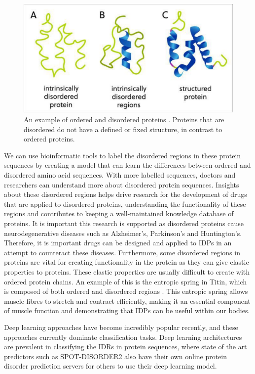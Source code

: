 \documentclass{l4proj}
\begin{document}
\begin{figure}[!htb]
    \centering
    \includegraphics[width=\linewidth]{images/structprot.pdf}

    \caption{An example of ordered and disordered proteins \citep{Tenchov:22}. Proteins that are disordered do not have a defined or fixed structure, in contrast to ordered proteins.}
    \label{fig:structured prot} 
\end{figure}

We can use bioinformatic tools to label the disordered regions in these protein sequences by creating a model that can learn the differences between ordered and disordered amino acid sequences. With more labelled sequences, doctors and researchers can understand more about disordered protein sequences. Insights about these disordered regions helps drive research for the development of drugs that are applied to disordered proteins, understanding the functionality of these regions and contributes to keeping a well-maintained knowledge database of proteins. It is important this research is supported as disordered proteins cause neurodegenerative diseases such as Alzheimer’s, Parkinson’s and Huntington’s. Therefore, it is important drugs can be designed and applied to IDPs in an attempt to counteract these diseases. Furthermore, some disordered regions in proteins are vital for creating functionality in the protein as they can give elastic properties to proteins. These elastic properties are usually difficult to create with ordered protein chains. An example of this is the entropic spring in Titin, which is composed of both ordered and disordered regions \citep{Morgan:17}. This entropic spring allows muscle fibres to stretch and contract efficiently, making it an essential component of muscle function and demonstrating that IDPs can be useful within our bodies.

Deep learning approaches have become incredibly popular recently, and these approaches currently dominate classification tasks. Deep learning architectures are prevalent in classifying the IDRs in protein sequences, where state of the art predictors such as SPOT-DISORDER2 \citep{Hanson:19} also have their own online protein disorder prediction servers for others to use their deep learning model.
\end{document}
